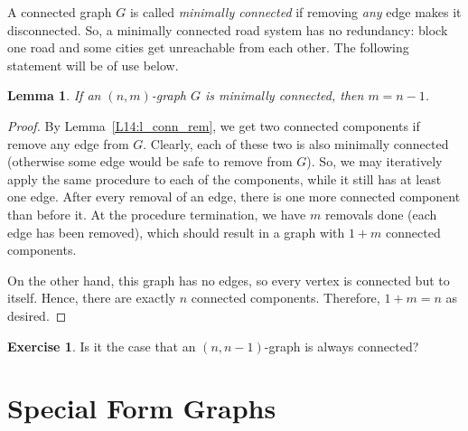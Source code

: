 \documentclass[12pt,notitlepage]{article}
\theoremstyle{plain}
\newtheorem{lemma}[thm]{Lemma}
\theoremstyle{definition}
\newtheorem{exc}[thm]{Exercise}
\theoremstyle{plain}
\newcommand{\1}{\mathbf{1}}
\newcommand{\0}{\mathbf{0}}
\begin{document}
A connected graph $G$ is called \emph{minimally connected} if removing \emph{any} edge makes it disconnected. So, a minimally connected road system has no redundancy: block one road and some cities get unreachable from each other. The following statement will be of use below.

\begin{lemma}\label{L14:l_min_conn_edge}
If an $(n,m)$-graph $G$ is minimally connected, then $m = n - 1$.
\end{lemma}
\begin{proof}
By Lemma~\ref{L14:l_conn_rem}, we get two connected components if remove any edge from $G$. Clearly, each of these two is also minimally connected (otherwise some edge would be safe to remove from $G$). So, we may iteratively apply the same procedure to each of the components, while it still has at least one edge. After every removal of an edge, there is one more connected component than before it. At the procedure termination, we have $m$ removals done (each edge has been removed), which should result in a graph with $1 + m$ connected components.

On the other hand, this graph has no edges, so every vertex is connected but to itself. Hence, there are exactly $n$ connected components. Therefore, $1 + m = n$ as desired.
\end{proof}

\begin{exc}
Is it the case that an $(n, n - 1)$-graph is always connected?
\end{exc}

\newpage
\section{Special Form Graphs}
\end{document}
